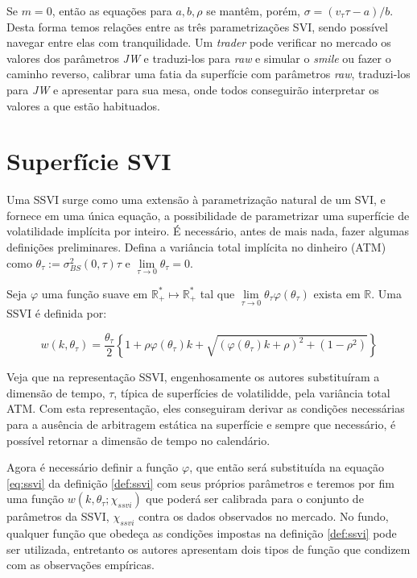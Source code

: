\documentclass[]{book}
\theoremstyle{definition}
\theoremstyle{definition}
\theoremstyle{definition}
\theoremstyle{remark}
\let\BeginKnitrBlock\begin \let\EndKnitrBlock\end
\begin{document}
Se \(m=0\), então as equações para \(a, b, \rho\) se mantêm, porém,
\(\sigma = (v_\tau \tau-a)/b\). Desta forma temos relações entre as três
parametrizações SVI, sendo possível navegar entre elas com
tranquilidade. Um \emph{trader} pode verificar no mercado os valores dos
parâmetros \emph{JW} e traduzi-los para \emph{raw} e simular o
\emph{smile} ou fazer o caminho reverso, calibrar uma fatia da
superfície com parâmetros \emph{raw}, traduzi-los para \emph{JW} e
apresentar para sua mesa, onde todos conseguirão interpretar os valores
a que estão habituados.

\section{Superfície SVI}\label{superficie-svi}

Uma SSVI surge como uma extensão à parametrização natural de um SVI, e
fornece em uma única equação, a possibilidade de parametrizar uma
superfície de volatilidade implícita por inteiro. É necessário, antes de
mais nada, fazer algumas definições preliminares. Defina a variância
total implícita no dinheiro (ATM) como
\(\theta_\tau:=\sigma_{BS}^2(0, \tau)\tau\) e
\(\lim\limits_{\tau\rightarrow 0}\theta_\tau = 0\).

\BeginKnitrBlock{definition}
\protect\hypertarget{def:ssvi}{}{\label{def:ssvi} }Seja \(\varphi\) uma
função suave em \(\mathbb R_+^*\mapsto \mathbb R_+^*\) tal que
\(\lim\limits_{\tau\rightarrow 0}\theta_\tau \varphi(\theta_\tau)\)
exista em \(\mathbb R\). Uma SSVI é definida por:
\EndKnitrBlock{definition}

\begin{equation}
w(k, \theta_\tau)=\frac{\theta_\tau}{2}\left\lbrace 1+\rho\varphi(\theta_\tau)k+\sqrt{(\varphi(\theta_\tau)k+\rho)^2+(1-\rho^2)} \right\rbrace
\label{eq:ssvi}
\end{equation}

Veja que na representação SSVI, engenhosamente os autores substituíram a
dimensão de tempo, \(\tau\), típica de superfícies de volatilidde, pela
variância total ATM. Com esta representação, eles conseguiram derivar as
condições necessárias para a ausência de arbitragem estática na
superfície e sempre que necessário, é possível retornar a dimensão de
tempo no calendário.

Agora é necessário definir a função \(\varphi\), que então será
substituída na equação \eqref{eq:ssvi} da definição \ref{def:ssvi} com
seus próprios parâmetros e teremos por fim uma função
\(w(k, \theta_\tau; \chi_{ssvi})\) que poderá ser calibrada para o
conjunto de parâmetros da SSVI, \(\chi_{ssvi}\) contra os dados
observados no mercado. No fundo, qualquer função que obedeça as
condições impostas na definição \ref{def:ssvi} pode ser utilizada,
entretanto os autores apresentam dois tipos de função que condizem com
as observações empíricas.
\end{document}
